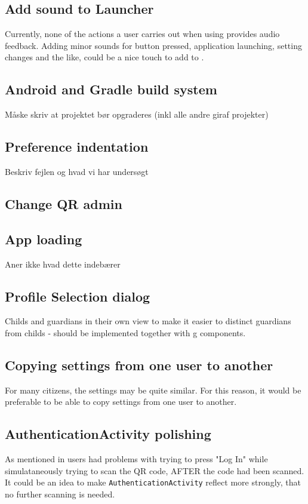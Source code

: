 \subsection{Add sound to Launcher}
Currently, none of the actions a user carries out when using \launcher provides audio feedback.
Adding minor sounds for button pressed, application launching, setting changes and the like, could be a nice touch to add to \launcher. 

\subsection{Android and Gradle build system}
Måske skriv at projektet bør opgraderes (inkl alle andre giraf projekter)

\subsection{Preference indentation}
Beskriv fejlen og hvad vi har undersøgt

\subsection{Change QR admin}

\subsection{App loading}
Aner ikke hvad dette indebærer

\subsection{Profile Selection dialog}
Childs and guardians in their own view to make it easier to distinct guardians from childs - should be implemented together with g components.

\subsection{Copying settings from one user to another}
For many citizens, the settings may be quite similar.
For this reason, it would be preferable to be able to copy settings from one user to another.

\subsection{AuthenticationActivity polishing}
As mentioned in  users had problems with trying to press "Log In" while simulataneously trying to scan the QR code, AFTER the code had been scanned.
It could be an idea to make \lstinline!AuthenticationActivity! reflect more strongly, that no further scanning is needed.
